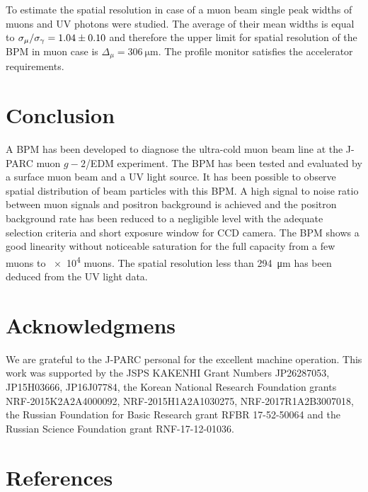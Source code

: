 \documentclass[preprint,3p,twocolumn]{elsarticle}
\begin{document}
To estimate the spatial resolution in case of a muon beam single peak widths of muons and UV photons were studied.
The average of their mean widths is equal to
$\sigma_{\mu} / \sigma_{\gamma} = \num{1.04 \pm 0.10}$
and therefore the upper limit for spatial resolution of the BPM in muon case is
$\Delta_\mu = \SI{306}{\um}$.
The profile monitor satisfies the accelerator requirements.


\section{Conclusion}

A BPM has been developed to diagnose the ultra-cold muon beam line at the J-PARC muon $g-2$/EDM experiment. The BPM has been tested and evaluated by a surface muon beam and a UV light source.
It has been possible to observe spatial distribution of beam particles with this BPM.
A high signal to noise ratio between muon signals and positron background is achieved and the positron background rate has been reduced to a negligible level with the adequate selection criteria and short exposure window for CCD camera.
The BPM shows a good linearity without noticeable saturation for the full capacity from a few muons to \num{e4} muons. The spatial resolution less than \SI{294}{\micro\metre} has been deduced from the UV light data.


\section*{Acknowledgmens}

We are grateful to the J-PARC personal for the excellent machine operation.
This work was supported by 
the JSPS KAKENHI Grant Numbers JP26287053, JP15H03666, JP16J07784,
the Korean National Research Foundation grants NRF-2015K2A2A4000092, NRF-2015H1A2A1030275, NRF-2017R1A2B3007018,
the Russian Foundation for Basic Research grant RFBR 17-52-50064 and
the Russian Science Foundation grant RNF-17-12-01036. 

\section*{References}


\end{document}
